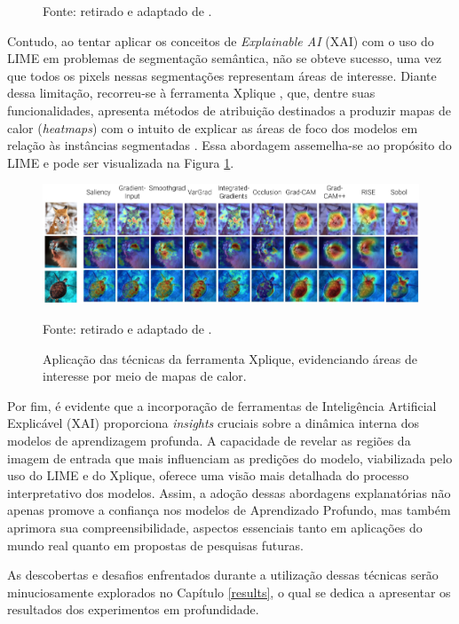 \begin{figure}[H]
    Fonte: retirado e adaptado de \cite{Ribeiro2016WhyClassifier}.
\end{figure}

Contudo, ao tentar aplicar os conceitos de \textit{Explainable AI} (XAI) com o uso do LIME em problemas de segmentação semântica, não se obteve sucesso, uma vez que todos os pixels nessas segmentações representam áreas de interesse. Diante dessa limitação, recorreu-se à ferramenta Xplique \citep{Fel2022Xplique:Toolbox}, que, dentre suas funcionalidades, apresenta métodos de atribuição destinados a produzir mapas de calor (\textit{heatmaps}) com o intuito de explicar as áreas de foco dos modelos em relação às instâncias segmentadas \citep{Fel2022Xplique:Toolbox}. Essa abordagem assemelha-se ao propósito do LIME e pode ser visualizada na Figura \ref{project:fig:explain:xplique}.

\begin{figure}[H]
    \centering
    \caption{Aplicação das técnicas da ferramenta Xplique, evidenciando áreas de interesse por meio de mapas de calor.}
    \includegraphics[width=1\textwidth]{recursos/imagens/project/xplique.png}
    \label{project:fig:explain:xplique}

    Fonte: retirado e adaptado de \cite{Fel2022Xplique:Toolbox}.
\end{figure}

Por fim, é evidente que a incorporação de ferramentas de Inteligência Artificial Explicável (XAI) proporciona \textit{insights} cruciais sobre a dinâmica interna dos modelos de aprendizagem profunda. A capacidade de revelar as regiões da imagem de entrada que mais influenciam as predições do modelo, viabilizada pelo uso do LIME e do Xplique, oferece uma visão mais detalhada do processo interpretativo dos modelos. Assim, a adoção dessas abordagens explanatórias não apenas promove a confiança nos modelos de Aprendizado Profundo, mas também aprimora sua compreensibilidade, aspectos essenciais tanto em aplicações do mundo real quanto em propostas de pesquisas futuras.

As descobertas e desafios enfrentados durante a utilização dessas técnicas serão minuciosamente explorados no Capítulo \ref{results}, o qual se dedica a apresentar os resultados dos experimentos em profundidade.

